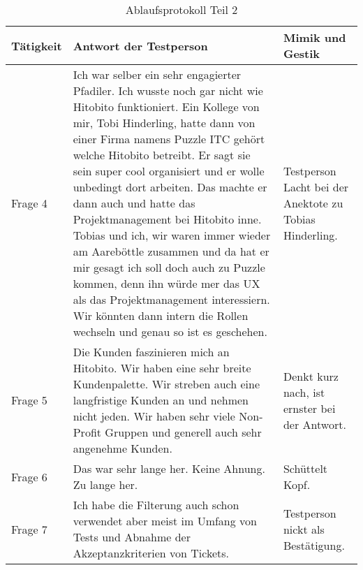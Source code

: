 \begin{table}[h!]
   \begin{tabular}{|L{0.3\textwidth}|L{0.4\textwidth}|L{0.2\textwidth}|}
       \hline
       \color{white}Tätigkeit & \color{white} Antwort der Testperson & \color{white} Mimik und Gestik \\
       \hline
       Frage 4 & Ich war selber ein sehr engagierter Pfadiler. Ich wusste noch gar nicht wie Hitobito funktioniert. Ein Kollege von mir, Tobi Hinderling, hatte
       dann von einer Firma namens Puzzle ITC gehört welche Hitobito betreibt. Er sagt sie sein super cool organisiert und er wolle unbedingt dort arbeiten. Das machte er
       dann auch und hatte das Projektmanagement bei Hitobito inne. Tobias und ich, wir waren immer wieder am Aareböttle zusammen und da hat er mir gesagt ich soll doch auch zu Puzzle kommen,
       denn ihn würde mer das UX als das Projektmanagement interessiern. Wir könnten dann intern die Rollen wechseln und genau so ist es geschehen. & Testperson Lacht bei der Anektote zu Tobias Hinderling. \\
       \hline
       Frage 5 & Die Kunden faszinieren mich an Hitobito. Wir haben eine sehr breite Kundenpalette. Wir streben auch eine langfristige Kunden an und nehmen nicht jeden.
       Wir haben sehr viele Non-Profit Gruppen und generell auch sehr angenehme Kunden. & Denkt kurz nach, ist ernster bei der Antwort. \\
       \hline
       Frage 6 & Das war sehr lange her. Keine Ahnung. Zu lange her. & Schüttelt Kopf. \\
       \hline
       Frage 7 & Ich habe die Filterung auch schon verwendet aber meist im Umfang von Tests und Abnahme der Akzeptanzkriterien von Tickets. & Testperson nickt als Bestätigung. \\
     \hline
     \end{tabular}
     \caption{Ablaufsprotokoll Teil 2}
\end{table}

\newpage

